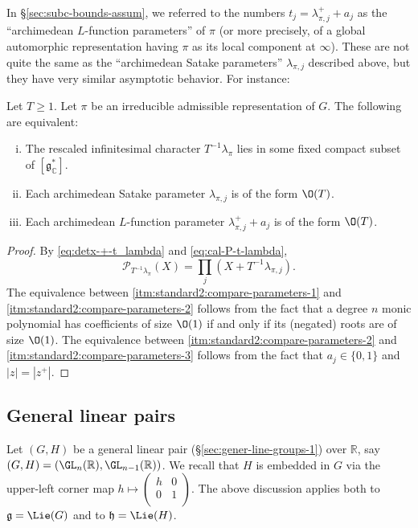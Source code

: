 In \S\ref{sec:subc-bounds-assum}, we referred to the numbers $t_j = \lambda_{\pi,j}^+ + a_j$ as the ``archimedean $L$-function parameters'' of $\pi$ (or more precisely, of a global automorphic representation having $\pi$ as its local component at $\infty$).  These are not quite the same as the ``archimedean Satake parameters'' $\lambda_{\pi,j}$ described above, but they have very similar asymptotic behavior.  For instance:
\begin{lemma}\label{lem:standard:let-t-geq}
  Let $T \geq 1$.  Let $\pi$ be an irreducible admissible representation of $G$.  The following are equivalent:
  \begin{enumerate}[(i)]
  \item \label{itm:standard2:compare-parameters-1} The rescaled infinitesimal character $T^{-1} \lambda_\pi$ lies in some fixed compact subset of $[\mathfrak{g}_{\mathbb{C}}^*]$.
  \item \label{itm:standard2:compare-parameters-2} Each archimedean Satake parameter  $\lambda_{\pi,j}$ is of the form $\O(T)$.
  \item  \label{itm:standard2:compare-parameters-3} Each archimedean $L$-function parameter $\lambda_{\pi,j}^+ + a_j$ is of the form $\O(T)$.
  \end{enumerate}
\end{lemma}
\begin{proof}
  By \eqref{eq:detx-+-t_lambda} and \eqref{eq:cal-P-t-lambda},
  \begin{equation*}
    \mathcal{P}_{T^{-1} \lambda_\pi}(X) = \prod_j (X + T^{-1} \lambda_{\pi,j}).
  \end{equation*}
  The equivalence between \eqref{itm:standard2:compare-parameters-1} and \eqref{itm:standard2:compare-parameters-2}
  follows from the fact that a degree $n$ monic polynomial has coefficients of size $\O(1)$ if and only if its (negated) roots are of size $\O(1)$.
  The equivalence between \eqref{itm:standard2:compare-parameters-2} and \eqref{itm:standard2:compare-parameters-3} follows from the fact that $a_j \in \{0,1\}$ and $|z| = |z^+|$.
\end{proof}

\subsection{General linear pairs}
Let $(G,H)$ be a general linear pair (\S\ref{sec:gener-line-groups-1}) over $\mathbb{R}$, say $(G,H) = (\GL_n(\mathbb{R}), \GL_{n-1}(\mathbb{R}))$.  We recall that $H$ is embedded in $G$ via the upper-left corner map $h \mapsto \left(
  \begin{smallmatrix}
    h&0\\
    0&1 \\
  \end{smallmatrix}
\right)$.  The above discussion applies both to $\mathfrak{g} = \Lie(G)$ and to $\mathfrak{h} = \Lie(H)$.

